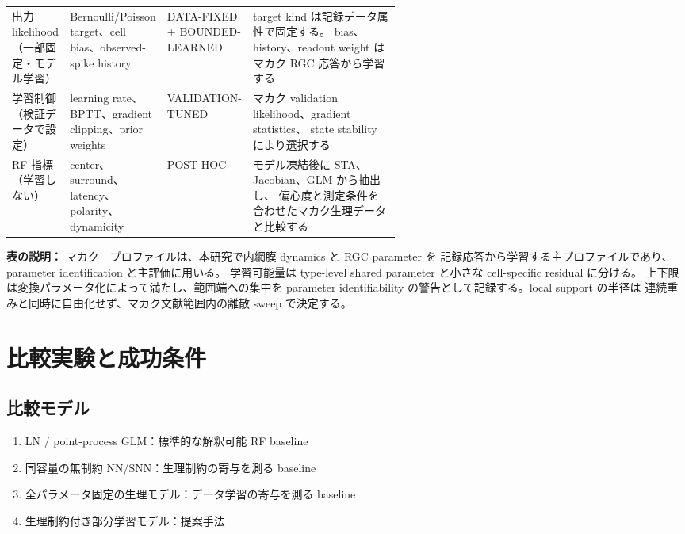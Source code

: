 \documentclass[a4paper,10pt,twocolumn,uplatex,dvipdfmx]{jsarticle}
\begin{document}
\begin{tabularx}{0.98\linewidth}{
  >{\raggedright\arraybackslash}p{0.14\linewidth}
  >{\raggedright\arraybackslash}p{0.24\linewidth}
  >{\raggedright\arraybackslash}p{0.19\linewidth}
  Y}
出力 likelihood\newline（一部固定・モデル学習） &
Bernoulli/Poisson target、cell bias、observed-spike history &
DATA-FIXED + BOUNDED-LEARNED &
target kind は記録データ属性で固定する。
bias、history、readout weight はマカク RGC 応答から学習する \\

学習制御\newline（検証データで設定） &
learning rate、BPTT、gradient clipping、prior weights &
VALIDATION-TUNED &
マカク validation likelihood、gradient statistics、
state stability により選択する \\

RF 指標\newline（学習しない） &
center、surround、latency、polarity、dynamicity &
POST-HOC &
モデル凍結後に STA、Jacobian、GLM から抽出し、
偏心度と測定条件を合わせたマカク生理データと比較する \\
\bottomrule
\end{tabularx}

\vspace{0.6\baselineskip}
\noindent\textbf{表の説明：}
マカク　プロファイルは、本研究で内網膜 dynamics と RGC parameter を
記録応答から学習する主プロファイルであり、parameter identification と主評価に用いる。
学習可能量は type-level shared parameter と小さな cell-specific residual に分ける。
上下限は変換パラメータ化によって満たし、範囲端への集中を
parameter identifiability の警告として記録する。local support の半径は
連続重みと同時に自由化せず、マカク文献範囲内の離散 sweep で決定する。

\clearpage
\twocolumn

\section{比較実験と成功条件}

\subsection{比較モデル}

\begin{enumerate}
  \item LN / point-process GLM：標準的な解釈可能 RF baseline
  \item 同容量の無制約 NN/SNN：生理制約の寄与を測る baseline
  \item 全パラメータ固定の生理モデル：データ学習の寄与を測る baseline
  \item 生理制約付き部分学習モデル：提案手法
\end{enumerate}
\end{document}
